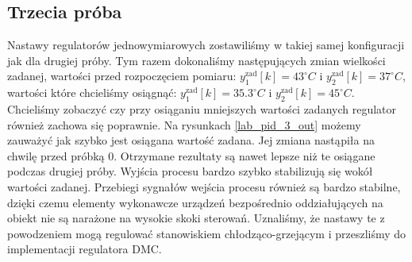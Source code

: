 \subsection{Trzecia próba}
\label{thermal_pid_proba_3}
Nastawy regulatorów jednowymiarowych zostawiliśmy w takiej samej konfiguracji jak dla drugiej próby. Tym razem dokonaliśmy następujących zmian wielkości zadanej, wartości przed rozpoczęciem pomiaru: $y_{\mathrm{1}}^{\mathrm{zad}}[k] = 43^{\circ} C$ i $y_{\mathrm{2}}^{\mathrm{zad}}[k] = 37^{\circ} C$, wartości które chcieliśmy osiągnąć:  $y_{\mathrm{1}}^{\mathrm{zad}}[k] = \num{35.3}^{\circ} C$ i $y_{\mathrm{2}}^{\mathrm{zad}}[k] = 45^{\circ} C$. Chcieliśmy zobaczyć czy przy osiąganiu mniejszych wartości zadanych regulator również zachowa się poprawnie. Na rysunkach \ref{lab_pid_3_out} możemy zauważyć jak szybko jest osiągana wartość zadana. Jej zmiana nastąpiła na chwilę przed próbką $0$. Otrzymane rezultaty są nawet lepsze niż te osiągane podczas drugiej próby. Wyjścia procesu bardzo szybko stabilizują się wokół wartości zadanej. Przebiegi sygnałów wejścia procesu również są bardzo stabilne, dzięki czemu elementy wykonawcze urządzeń bezpośrednio oddziałujących na obiekt nie są narażone na wysokie skoki sterowań. Uznaliśmy, że nastawy te z powodzeniem mogą regulować stanowiskiem chłodząco-grzejącym i przeszliśmy do implementacji regulatora DMC.


